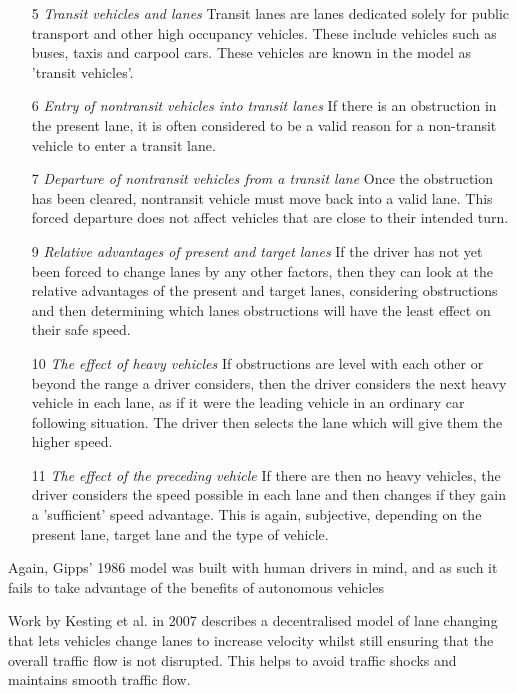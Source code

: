 \begin{enumerate}
\item[5] \textit{Transit vehicles and lanes}
Transit lanes are lanes dedicated solely for public transport and other high occupancy vehicles. These include vehicles such as buses, taxis and carpool cars. These vehicles are known in the model as 'transit vehicles'.
\item[6] \textit{Entry of nontransit vehicles into transit lanes}
If there is an obstruction in the present lane, it is often considered to be a valid reason for a non-transit vehicle to enter a transit lane. 
\item[7] \textit{Departure of nontransit vehicles from a transit lane}
Once the obstruction has been cleared, nontransit vehicle must move back into a valid lane. This forced departure does not affect vehicles that are close to their intended turn.
\item[9] \textit{Relative advantages of present and target lanes}
If the driver has not yet been forced to change lanes by any other factors, then they can look at the relative advantages of the present and target lanes, considering obstructions and then determining which lanes obstructions will have the least effect on their safe speed.
\item[10] \textit{The effect of heavy vehicles} 
If obstructions are level with each other or beyond the range a driver considers, then the driver considers the next heavy vehicle in each lane, as if it were the leading vehicle in an ordinary car following situation. The driver then selects the lane which will give them the higher speed.
\item[11] \textit{The effect of the preceding vehicle}
If there are then no heavy vehicles, the driver considers the speed possible in each lane and then changes if they gain a 'sufficient' speed advantage. This is again, subjective, depending on the present lane, target lane and the type of vehicle.
\end{enumerate}

Again, Gipps' 1986 model was built with human drivers in mind, and as such it fails to take advantage of the benefits of autonomous vehicles 

Work by Kesting et al. in 2007 \citep{Kesting2007} describes a decentralised model of lane changing that lets vehicles change lanes to increase velocity whilst still ensuring that the overall traffic flow is not disrupted. This helps to avoid traffic shocks and maintains smooth traffic flow. 

